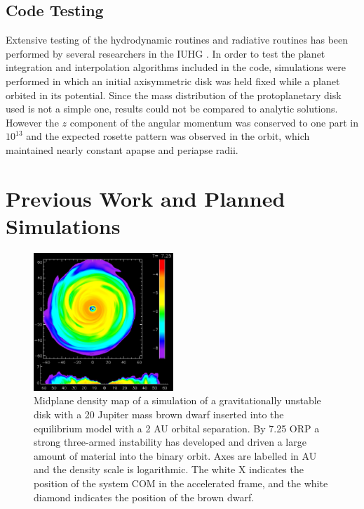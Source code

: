 \documentclass[12pt,preprint2]{aastex}
\begin{document}
\subsection{Code Testing}
\label{sec:tests}

Extensive testing of the hydrodynamic routines and radiative routines has been performed by several researchers in the
IUHG \citep{yangphd1992,pickettphd1995,pickett2000,pickett2003,mejia2005,boley2007b}. In order to test the planet
integration and interpolation algorithms included in the code, simulations were performed in which an initial
axisymmetric disk was held fixed while a planet orbited in its potential. Since the mass distribution of the
protoplanetary disk used is not a simple one, results could not be compared to analytic solutions. However the $z$
component of the angular momentum was conserved to one part in $10^{13}$ and the expected rosette pattern was observed
in the orbit, which maintained nearly constant apapse and periapse radii.

\section{Previous Work and Planned Simulations}
\label{sec:plan}

\begin{figure}[t]
\includegraphics[width=0.47\textwidth]{binary.eps}
\caption{Midplane density map of a simulation of a gravitationally unstable disk with a 20 Jupiter mass brown dwarf
  inserted into the equilibrium model with a 2 AU orbital separation. By 7.25 ORP a strong three-armed instability has
  developed and driven a large amount of material into the binary orbit. Axes are labelled in AU and the density scale
  is logarithmic. The white X indicates the position of the system COM in the accelerated frame, and the white diamond
  indicates the position of the brown dwarf.}
\label{fig:binary}
\end{figure}
\end{document}
